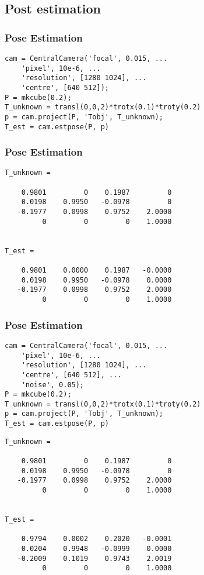 \subsection{Post estimation}

\begin{frame}[fragile]
\frametitle{Pose Estimation}
\begin{lstlisting}
cam = CentralCamera('focal', 0.015, ...
    'pixel', 10e-6, ... 
    'resolution', [1280 1024], ...
    'centre', [640 512]);
P = mkcube(0.2);
T_unknown = transl(0,0,2)*trotx(0.1)*troty(0.2)
p = cam.project(P, 'Tobj', T_unknown);
T_est = cam.estpose(P, p)
\end{lstlisting}
\end{frame}

\begin{frame}[fragile]
\frametitle{Pose Estimation}
\begin{lstlisting}
T_unknown =

    0.9801         0    0.1987         0
    0.0198    0.9950   -0.0978         0
   -0.1977    0.0998    0.9752    2.0000
         0         0         0    1.0000


T_est =

    0.9801    0.0000    0.1987   -0.0000
    0.0198    0.9950   -0.0978    0.0000
   -0.1977    0.0998    0.9752    2.0000
         0         0         0    1.0000
\end{lstlisting}
\end{frame}

\begin{frame}[fragile]
\frametitle{Pose Estimation}
\begin{lstlisting}
cam = CentralCamera('focal', 0.015, ...
    'pixel', 10e-6, ... 
    'resolution', [1280 1024], ...
    'centre', [640 512], ... 
    'noise', 0.05);
P = mkcube(0.2);
T_unknown = transl(0,0,2)*trotx(0.1)*troty(0.2)
p = cam.project(P, 'Tobj', T_unknown);
T_est = cam.estpose(P, p)
\end{lstlisting}
\end{frame}

\begin{frame}[fragile]
\begin{lstlisting}
T_unknown =

    0.9801         0    0.1987         0
    0.0198    0.9950   -0.0978         0
   -0.1977    0.0998    0.9752    2.0000
         0         0         0    1.0000


T_est =

    0.9794    0.0002    0.2020   -0.0001
    0.0204    0.9948   -0.0999    0.0000
   -0.2009    0.1019    0.9743    2.0019
         0         0         0    1.0000
\end{lstlisting}
\end{frame}

